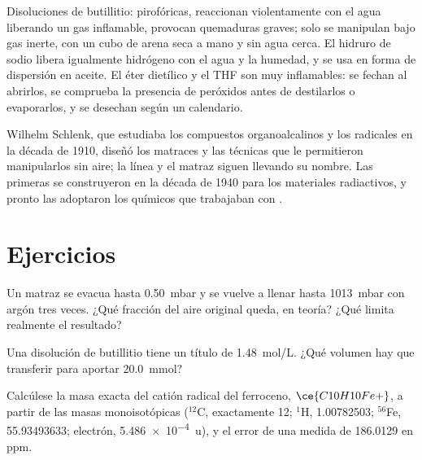 \begin{safety}{}
Disoluciones de butillitio: pirofóricas, reaccionan violentamente con el agua liberando un
gas inflamable, provocan quemaduras graves; solo se manipulan bajo gas inerte, con un cubo de
arena seca a mano y sin agua cerca. El hidruro de sodio libera igualmente
hidrógeno con el agua y la humedad, y se usa en forma de dispersión en aceite. El éter
dietílico y el THF son  muy inflamables: se fechan al abrirlos, se comprueba
la presencia de peróxidos antes de destilarlos o evaporarlos, y se desechan según un calendario.
\end{safety}

\begin{history}
Wilhelm Schlenk, que estudiaba los compuestos organoalcalinos y los radicales en la década de 1910,
diseñó los matraces y las técnicas que le permitieron manipularlos sin aire; la
línea y el matraz siguen llevando su nombre. Las primeras  se construyeron en la
década de 1940 para los materiales radiactivos, y pronto las adoptaron los químicos que trabajaban con
.
\end{history}

\section{Ejercicios}

\begin{exercise}[$\star$]\label{exo:b3:lab-techniques-3:1}
Un matraz se evacua hasta \qty{0.50}{mbar} y se vuelve a llenar hasta \qty{1013}{mbar} con argón tres veces. ¿Qué fracción del
aire original queda, en teoría? ¿Qué limita realmente el resultado?
\end{exercise}

\begin{exercise}[$\star$]\label{exo:b3:lab-techniques-3:2}
Una disolución de butillitio tiene un título de \qty{1.48}{mol/L}. ¿Qué volumen hay que transferir para aportar
\qty{20.0}{mmol}?
\end{exercise}

\begin{exercise}[$\star$]\label{exo:b3:lab-techniques-3:3}
Calcúlese la masa exacta del catión radical del ferroceno, $\ce{C10H10Fe+}$, a partir de las masas monoisotópicas
($^{12}$C, exactamente 12; $^1$H, 1.00782503; $^{56}$Fe, 55.93493633; electrón, \qty{5.486e-4}{u}), y el error de una medida de
186.0129 en ppm.
\end{exercise}

